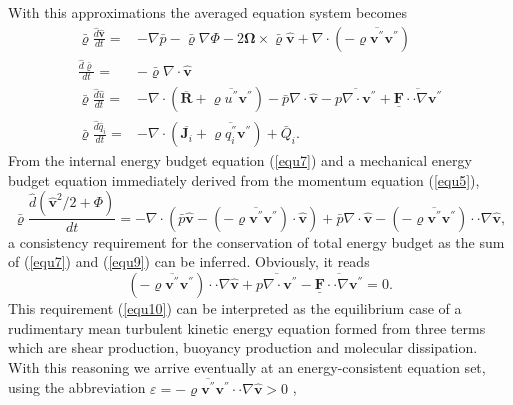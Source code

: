 With this approximations the averaged equation system becomes
\begin{align}
\bar{\varrho}\frac{\hat{d}\hat{\mathbf{v}}}{dt}
=&-\nabla\bar{p}-\bar{\varrho}\nabla\Phi
-2 \mathbf{\Omega}\times \bar{\varrho}\hat{\mathbf{v}}
+\nabla\cdot(- \overline{\varrho \mathbf{v}^{''}\mathbf{v}^{''}})
\label{equ5}\\
\frac{\hat{d}\bar{\varrho}}{dt}
= &- \bar{\varrho}\nabla\cdot \hat{\mathbf{v}}\label{equ6}\\
\bar{\varrho}\frac{\hat{d}\hat{u}}{dt}
=&- \nabla\cdot( \overline{\mathbf{R}}+\overline{\varrho u^{''}\mathbf{v}^{''}}) -\bar{p}\nabla\cdot \hat{\mathbf{v}} - \overline{p \nabla\cdot {\mathbf{v}}^{''}}
+\overline{\underline{\mathbf{F}}\cdot\cdot\nabla \mathbf{v}^{''}}\label{equ7}\\
\bar{\varrho}\frac{\hat{d}\hat{q}_{i}}{dt}
=&- \nabla\cdot( \overline{\mathbf{J}_{i}} + \overline{\varrho q_{i}^{''}\mathbf{v}^{''}}) + \bar{Q}_i .\label{equ8}
\end{align}
From the internal energy budget equation (\ref{equ7}) and a mechanical energy budget equation immediately derived from the momentum equation (\ref{equ5}),
\begin{equation}
\bar{\varrho}\frac{\hat{d}\left( \hat{\mathbf{v}}^2/2 + \Phi\right)}{dt} =-\nabla \cdot (  \bar{p}\hat{\mathbf{v}}-(- \overline{\varrho \mathbf{v}^{''}\mathbf{v}^{''}}) \cdot \hat{\mathbf{v}} ) + \bar{p} \nabla \cdot\hat{\mathbf{v}}
- (-\overline{\varrho \mathbf{v}^{''}\mathbf{v}^{''}}) \cdot \cdot \nabla\hat{\mathbf{v}} ,\label{equ9}
\end{equation}
a consistency requirement for the conservation of total energy budget as the sum of (\ref{equ7}) and (\ref{equ9}) can be inferred. Obviously, it reads
\begin{equation}
(-\overline{\varrho \mathbf{v}^{''}\mathbf{v}^{''}}) \cdot \cdot \nabla\hat{\mathbf{v}} + \overline{p \nabla\cdot {\mathbf{v}}^{''}} - 
\overline{\underline{\mathbf{F}}\cdot\cdot\nabla \mathbf{v}^{''}}=0 .
\label{equ10}
\end{equation} 
This requirement (\ref{equ10}) can be interpreted as the equilibrium case of a rudimentary mean turbulent kinetic energy equation formed from three terms which are shear production, buoyancy production and molecular dissipation.
With this reasoning we arrive eventually at an energy-consistent equation set,
using the abbreviation $\varepsilon = - \overline{\varrho \mathbf{v}^{''}\mathbf{v}^{''}}\cdot \cdot \nabla\hat{\mathbf{v}}> 0$ ,
